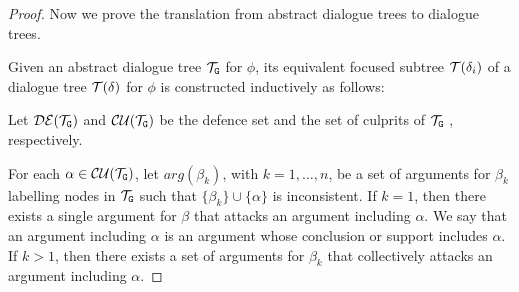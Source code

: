 \begin{proof}






Now we prove the translation from abstract dialogue trees to dialogue trees.

Given an abstract dialogue tree $\mathcal{T}_{\texttt{\textup{G}}}$ for $\phi$, its equivalent focused subtree $\mathcal{T}(\delta_i)$ of a dialogue tree $\mathcal{T}(\delta)$ for $\phi$ is constructed inductively as follows:

Let $\mathcal{DE}(\mathcal{T}_{\texttt{\textup{G}}})$ and $\mathcal{CU}(\mathcal{T}_{\texttt{\textup{G}}})$ be the defence set and the set of culprits of $\mathcal{T}_{\texttt{\textup{G}}}$ , respectively.

For each $\alpha \in \mathcal{CU}(\mathcal{T}_{\texttt{\textup{G}}})$, let $arg(\beta_k)$, with $k = 1, \ldots, n$, be a set of arguments for $\beta_k$ labelling nodes in $\mathcal{T}_{\texttt{\textup{G}}}$ such that $\{ \beta_k \} \cup \{\alpha\}$ is inconsistent.
If $k = 1$, then there exists a single argument for $\beta$ that attacks an argument including $\alpha$. We say that an argument including $\alpha$ is an argument whose conclusion or support includes $\alpha$.
If $ k > 1$, then there exists a set of arguments for $\beta_k$ that collectively attacks an argument including $\alpha$.


\end{proof}
